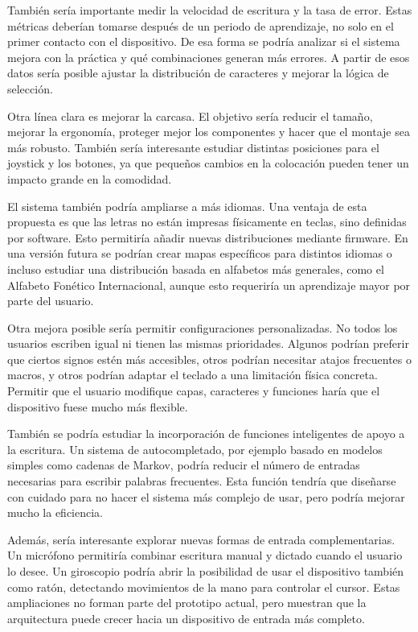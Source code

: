 También sería importante medir la velocidad de escritura y la tasa de error. Estas métricas deberían tomarse después de un periodo de aprendizaje, no solo en el primer contacto con el dispositivo. De esa forma se podría analizar si el sistema mejora con la práctica y qué combinaciones generan más errores. A partir de esos datos sería posible ajustar la distribución de caracteres y mejorar la lógica de selección.

Otra línea clara es mejorar la carcasa. El objetivo sería reducir el tamaño, mejorar la ergonomía, proteger mejor los componentes y hacer que el montaje sea más robusto. También sería interesante estudiar distintas posiciones para el joystick y los botones, ya que pequeños cambios en la colocación pueden tener un impacto grande en la comodidad.

El sistema también podría ampliarse a más idiomas. Una ventaja de esta propuesta es que las letras no están impresas físicamente en teclas, sino definidas por software. Esto permitiría añadir nuevas distribuciones mediante firmware. En una versión futura se podrían crear mapas específicos para distintos idiomas o incluso estudiar una distribución basada en alfabetos más generales, como el Alfabeto Fonético Internacional, aunque esto requeriría un aprendizaje mayor por parte del usuario.

Otra mejora posible sería permitir configuraciones personalizadas. No todos los usuarios escriben igual ni tienen las mismas prioridades. Algunos podrían preferir que ciertos signos estén más accesibles, otros podrían necesitar atajos frecuentes o macros, y otros podrían adaptar el teclado a una limitación física concreta. Permitir que el usuario modifique capas, caracteres y funciones haría que el dispositivo fuese mucho más flexible.

También se podría estudiar la incorporación de funciones inteligentes de apoyo a la escritura. Un sistema de autocompletado, por ejemplo basado en modelos simples como cadenas de Markov, podría reducir el número de entradas necesarias para escribir palabras frecuentes. Esta función tendría que diseñarse con cuidado para no hacer el sistema más complejo de usar, pero podría mejorar mucho la eficiencia.

Además, sería interesante explorar nuevas formas de entrada complementarias. Un micrófono permitiría combinar escritura manual y dictado cuando el usuario lo desee. Un giroscopio podría abrir la posibilidad de usar el dispositivo también como ratón, detectando movimientos de la mano para controlar el cursor. Estas ampliaciones no forman parte del prototipo actual, pero muestran que la arquitectura puede crecer hacia un dispositivo de entrada más completo.

